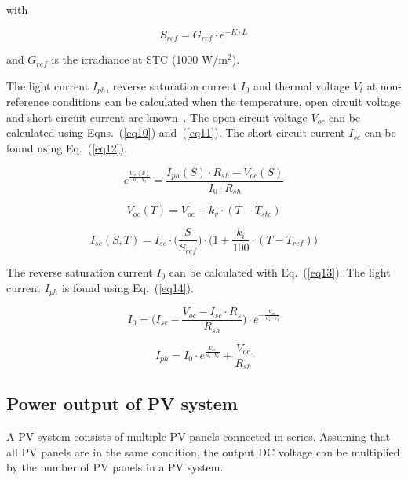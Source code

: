 with

\begin{equation}
S_{ref} = G_{ref} \cdot e^{-K \cdot L}
\label{eqSref}
\end{equation}

and $G_{ref}$ is the irradiance at STC (1000 W/m$^2$).

The light current $I_{ph}$, reverse saturation current $I_{0}$ and thermal voltage $V_{t}$ at non-reference conditions can be calculated when the temperature, open circuit voltage and short circuit current are known~\cite{sera}. The open circuit voltage $V_{oc}$ can be calculated using Eqns.~(\ref{eq10}) and~(\ref{eq11}). The short circuit current $I_{sc}$ can be found using Eq.~(\ref{eq12}).

\begin{equation}
e^{\frac{V_{oc}(S)}{n_{s} \cdot V_{t}}} = \frac{I_{ph}(S) \cdot R_{sh} - V_{oc}(S)}{I_{0} \cdot {R_{sh}}}
\label{eq10}
\end{equation}

\begin{equation}
V_{oc}(T) = V_{oc} + k_{v} \cdot (T - T_{stc})
\label{eq11}
\end{equation}

\begin{equation}
I_{sc}(S,T) = I_{sc} \cdot \biggl(\frac{S}{S_{ref}} \biggr) \cdot \biggl(1 + \frac{k_{i}}{100} \cdot (T - T_{ref}) \biggr)
\label{eq12}
\end{equation}

The reverse saturation current $I_{0}$ can be calculated with Eq.~(\ref{eq13}). The light current $I_{ph}$ is found using Eq.~(\ref{eq14}).

\begin{equation}
I_{0} = \biggl(I_{sc} - \frac{V_{oc} - I_{sc} \cdot R_{s}}{R_{sh}} \biggr) \cdot e^{-\frac{V_{oc}}{n_{s} \cdot V_{t}}}    
\label{eq13}
\end{equation}

\begin{equation}
I_{ph} = I_{0} \cdot e^{\frac{V_{oc}}{n_{s} \cdot V_{t}}} + \frac{V_{oc}}{R_{sh}}
\label{eq14}
\end{equation}

\subsection{Power output of PV system}
A PV system consists of multiple PV panels connected in series. Assuming that all PV panels are in the same condition, the output DC voltage can be multiplied by the number of PV panels in a PV system.

